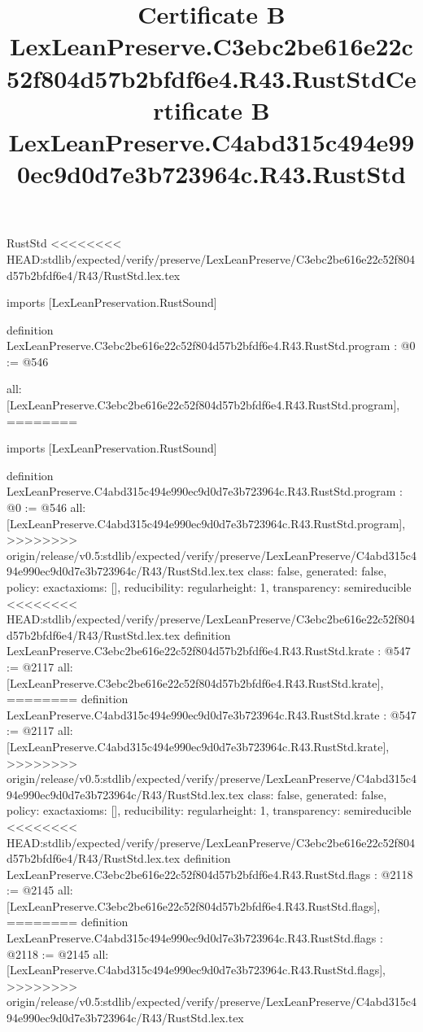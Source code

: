 \begin{lexlean}{RustStd}
<<<<<<<< HEAD:stdlib/expected/verify/preserve/LexLeanPreserve/C3ebc2be616e22c52f804d57b2bfdf6e4/R43/RustStd.lex.tex
\title{Certificate B LexLeanPreserve.C3ebc2be616e22c52f804d57b2bfdf6e4.R43.RustStd}
\begin{coremodule}
imports [LexLeanPreservation.RustSound]

definition LexLeanPreserve.C3ebc2be616e22c52f804d57b2bfdf6e4.R43.RustStd.program : @0 := @546 {
  all: [LexLeanPreserve.C3ebc2be616e22c52f804d57b2bfdf6e4.R43.RustStd.program],
========
\title{Certificate B LexLeanPreserve.C4abd315c494e990ec9d0d7e3b723964c.R43.RustStd}
\begin{coremodule}
imports [LexLeanPreservation.RustSound]

definition LexLeanPreserve.C4abd315c494e990ec9d0d7e3b723964c.R43.RustStd.program : @0 := @546 {
  all: [LexLeanPreserve.C4abd315c494e990ec9d0d7e3b723964c.R43.RustStd.program],
>>>>>>>> origin/release/v0.5:stdlib/expected/verify/preserve/LexLeanPreserve/C4abd315c494e990ec9d0d7e3b723964c/R43/RustStd.lex.tex
  class: false,
  generated: false,
  policy: exact{axioms: []},
  reducibility: regular{height: 1},
  transparency: semireducible
}
<<<<<<<< HEAD:stdlib/expected/verify/preserve/LexLeanPreserve/C3ebc2be616e22c52f804d57b2bfdf6e4/R43/RustStd.lex.tex
definition LexLeanPreserve.C3ebc2be616e22c52f804d57b2bfdf6e4.R43.RustStd.krate : @547 := @2117 {
  all: [LexLeanPreserve.C3ebc2be616e22c52f804d57b2bfdf6e4.R43.RustStd.krate],
========
definition LexLeanPreserve.C4abd315c494e990ec9d0d7e3b723964c.R43.RustStd.krate : @547 := @2117 {
  all: [LexLeanPreserve.C4abd315c494e990ec9d0d7e3b723964c.R43.RustStd.krate],
>>>>>>>> origin/release/v0.5:stdlib/expected/verify/preserve/LexLeanPreserve/C4abd315c494e990ec9d0d7e3b723964c/R43/RustStd.lex.tex
  class: false,
  generated: false,
  policy: exact{axioms: []},
  reducibility: regular{height: 1},
  transparency: semireducible
}
<<<<<<<< HEAD:stdlib/expected/verify/preserve/LexLeanPreserve/C3ebc2be616e22c52f804d57b2bfdf6e4/R43/RustStd.lex.tex
definition LexLeanPreserve.C3ebc2be616e22c52f804d57b2bfdf6e4.R43.RustStd.flags : @2118 := @2145 {
  all: [LexLeanPreserve.C3ebc2be616e22c52f804d57b2bfdf6e4.R43.RustStd.flags],
========
definition LexLeanPreserve.C4abd315c494e990ec9d0d7e3b723964c.R43.RustStd.flags : @2118 := @2145 {
  all: [LexLeanPreserve.C4abd315c494e990ec9d0d7e3b723964c.R43.RustStd.flags],
>>>>>>>> origin/release/v0.5:stdlib/expected/verify/preserve/LexLeanPreserve/C4abd315c494e990ec9d0d7e3b723964c/R43/RustStd.lex.tex
}}}
\end{coremodule}}
\end{coremodule}
\end{lexlean}
